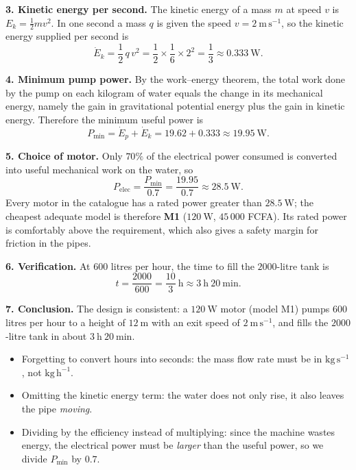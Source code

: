 \documentclass[11pt]{article}
\begin{document}
\textbf{3. Kinetic energy per second.} The kinetic energy of a mass $m$ at speed $v$ is $E_{k}=\tfrac{1}{2}mv^{2}$. In one second a mass $q$ is given the speed $v = 2\ \mathrm{m\,s^{-1}}$, so the kinetic energy supplied per second is
\[
\dot{E}_{k}=\frac{1}{2}\,q\,v^{2}=\frac{1}{2}\times \frac{1}{6}\times 2^{2}=\frac{1}{3}\approx 0.333\ \mathrm{W}.
\]

\textbf{4. Minimum pump power.} By the work--energy theorem, the total work done by the pump on each kilogram of water equals the change in its mechanical energy, namely the gain in gravitational potential energy plus the gain in kinetic energy. Therefore the minimum useful power is
\[
P_{\min}=\dot{E}_{p}+\dot{E}_{k}=19.62+0.333\approx 19.95\ \mathrm{W}.
\]

\textbf{5. Choice of motor.} Only $70\%$ of the electrical power consumed is converted into useful mechanical work on the water, so
\[
P_{\mathrm{elec}}=\frac{P_{\min}}{0.7}=\frac{19.95}{0.7}\approx 28.5\ \mathrm{W}.
\]
Every motor in the catalogue has a rated power greater than $28.5\ \mathrm{W}$; the cheapest adequate model is therefore \textbf{M1} ($120\ \mathrm{W}$, $45\,000$ FCFA). Its rated power is comfortably above the requirement, which also gives a safety margin for friction in the pipes.

\textbf{6. Verification.} At $600$ litres per hour, the time to fill the $2000$-litre tank is
\[
t=\frac{2000}{600}=\frac{10}{3}\ \mathrm{h}\approx 3\ \mathrm{h}\ 20\ \mathrm{min}.
\]

\textbf{7. Conclusion.} The design is consistent: a $120\ \mathrm{W}$ motor (model M1) pumps $600$ litres per hour to a height of $12\ \mathrm{m}$ with an exit speed of $2\ \mathrm{m\,s^{-1}}$, and fills the $2000$-litre tank in about $3\ \mathrm{h}\ 20\ \mathrm{min}$.

\begin{attention}
\begin{itemize}
\item Forgetting to convert hours into seconds: the mass flow rate must be in $\mathrm{kg\,s^{-1}}$, not $\mathrm{kg\,h^{-1}}$.
\item Omitting the kinetic energy term: the water does not only rise, it also leaves the pipe \emph{moving}.
\item Dividing by the efficiency instead of multiplying: since the machine wastes energy, the electrical power must be \emph{larger} than the useful power, so we divide $P_{\min}$ by $0.7$.
\end{itemize}
\end{attention}
\end{document}
